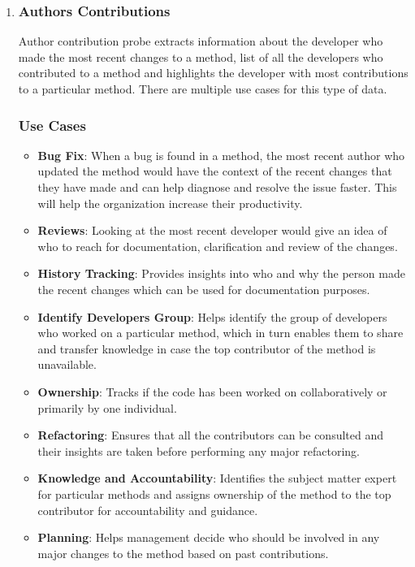 \begin{enumerate}[leftmargin=*, label=\arabic*.]

    \item \subsubsection*{Authors Contributions}
    Author contribution probe extracts information about the developer who made the most recent changes to a method, list of all the developers who contributed to a method and highlights the developer with most contributions to a particular method. There are multiple use cases for this type of data.
	\subsubsection{Use Cases}
	\begin{itemize}[label=$\bullet$]
		\item \textbf{Bug Fix}: When a bug is found in a method, the most recent author who updated the method would have the context of the recent changes that they have made and can help diagnose and resolve the issue faster. This will help the organization increase their productivity.
		\item \textbf{Reviews}: Looking at the most recent developer would give an idea of who to reach for documentation, clarification and review of the changes.
		\item \textbf{History Tracking}: Provides insights into who and why the person made the recent changes which can be used for documentation purposes.
		\item \textbf{Identify Developers Group}: Helps identify the group of developers who worked on a particular method, which in turn enables them to share and transfer knowledge in case the top contributor of the method is unavailable.
		\item \textbf{Ownership}: Tracks if the code has been worked on collaboratively or primarily by one individual.
		\item \textbf{Refactoring}: Ensures that all the contributors can be consulted and their insights are taken before performing any major refactoring.
		\item \textbf{Knowledge and Accountability}: Identifies the subject matter expert for particular methods and assigns ownership of the method to the top contributor for accountability and guidance.
		\item \textbf{Planning}: Helps management decide who should be involved in any major changes to the method based on past contributions.
	\end{itemize}

\end{enumerate}
